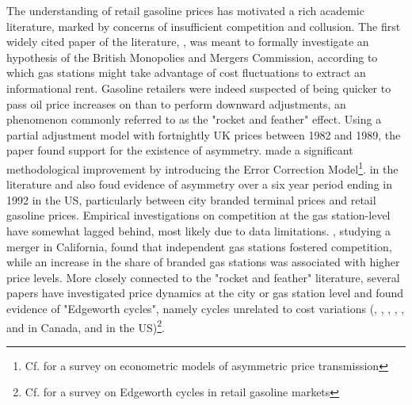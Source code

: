 \documentclass[english]{article}
\begin{document}
The understanding of retail gasoline prices has motivated a rich academic literature, marked by concerns of insufficient competition and collusion. The first widely cited paper of the literature, \cite{BAC91}, was meant to formally investigate an hypothesis of the British Monopolies and Mergers Commission, according to which gas stations might take advantage of cost fluctuations to extract an informational rent. Gasoline retailers were indeed suspected of being quicker to pass oil price increases on than to perform downward adjustments, an phenomenon commonly referred to as the "rocket and feather" effect. Using a partial adjustment model with fortnightly UK prices between 1982 and 1989, the paper found support for the existence of asymmetry. \cite{BOR97} made a significant methodological improvement by introducing the Error Correction Model\footnote{Cf. \cite{FRE07} for a survey on econometric models of asymmetric price transmission}. in the literature and also foud evidence of asymmetry over a six year period ending in 1992 in the US, particularly between city branded terminal prices and retail gasoline prices. Empirical investigations on competition at the gas station-level have somewhat lagged behind, most likely due to data limitations. \cite{HAS04}, studying a merger in California, found that independent gas stations fostered competition, while an increase in the share of branded gas stations was associated with higher price levels. More closely connected to the "rocket and feather" literature, several papers have investigated price dynamics at the city or gas station level and found evidence of "Edgeworth cycles", namely cycles unrelated to cost variations (\cite{ECK02}, \cite{ECK03}, \cite{ECK04a}, \cite{ECK04b}, \cite{NOE07a}, \cite{NOE07b} and \cite{NOE08} in Canada, \cite{LEW09} and \cite{LEW11a} in the US)\footnote{Cf. \cite{ECK13} for a survey on Edgeworth cycles in retail gasoline markets}.
\end{document}

